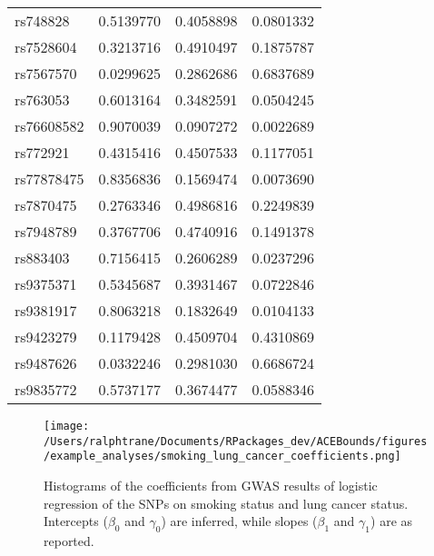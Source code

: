 \documentclass[
]{article}
\theoremstyle{plain}
\begin{document}
\begin{table}[H]
\begin{minipage}{0.5\linewidth}
\begin{tabular}{lrrr}
rs748828 & 0.5139770 & 0.4058898 & 0.0801332\\
rs7528604 & 0.3213716 & 0.4910497 & 0.1875787\\
rs7567570 & 0.0299625 & 0.2862686 & 0.6837689\\
\addlinespace
rs763053 & 0.6013164 & 0.3482591 & 0.0504245\\
rs76608582 & 0.9070039 & 0.0907272 & 0.0022689\\
rs772921 & 0.4315416 & 0.4507533 & 0.1177051\\
rs77878475 & 0.8356836 & 0.1569474 & 0.0073690\\
rs7870475 & 0.2763346 & 0.4986816 & 0.2249839\\
\addlinespace
rs7948789 & 0.3767706 & 0.4740916 & 0.1491378\\
rs883403 & 0.7156415 & 0.2606289 & 0.0237296\\
rs9375371 & 0.5345687 & 0.3931467 & 0.0722846\\
rs9381917 & 0.8063218 & 0.1832649 & 0.0104133\\
rs9423279 & 0.1179428 & 0.4509704 & 0.4310869\\
\addlinespace
rs9487626 & 0.0332246 & 0.2981030 & 0.6686724\\
rs9835772 & 0.5737177 & 0.3674477 & 0.0588346\\
\bottomrule
\end{tabular}


  \end{minipage}
\end{table}

\begin{figure}[H]
  \center
  \texttt{[image: /Users/ralphtrane/Documents/RPackages\_dev/ACEBounds/figures/example\_analyses/smoking\_lung\_cancer\_coefficients.png]}
  \caption{Histograms of the coefficients from GWAS results of logistic regression of the SNPs on smoking status and lung cancer status. Intercepts ($\beta_0$ and $\gamma_0$) are inferred, while slopes ($\beta_1$ and $\gamma_1$) are as reported.}
  \label{fig:marginal-distribution-of-coefficients-lung-cancer}
\end{figure}
\end{document}

